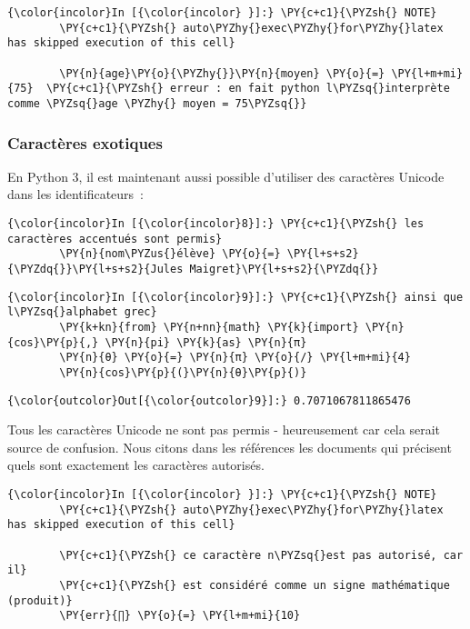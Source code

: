     \begin{Verbatim}[commandchars=\\\{\}]
{\color{incolor}In [{\color{incolor} }]:} \PY{c+c1}{\PYZsh{} NOTE}
        \PY{c+c1}{\PYZsh{} auto\PYZhy{}exec\PYZhy{}for\PYZhy{}latex has skipped execution of this cell}
        
        \PY{n}{age}\PY{o}{\PYZhy{}}\PY{n}{moyen} \PY{o}{=} \PY{l+m+mi}{75}  \PY{c+c1}{\PYZsh{} erreur : en fait python l\PYZsq{}interprète comme \PYZsq{}age \PYZhy{} moyen = 75\PYZsq{}}
\end{Verbatim}


    \hypertarget{caractuxe8res-exotiques}{%
\subsubsection{Caractères exotiques}\label{caractuxe8res-exotiques}}

    En Python 3, il est maintenant aussi possible d'utiliser des caractères
Unicode dans les identificateurs~:

    \begin{Verbatim}[commandchars=\\\{\}]
{\color{incolor}In [{\color{incolor}8}]:} \PY{c+c1}{\PYZsh{} les caractères accentués sont permis}
        \PY{n}{nom\PYZus{}élève} \PY{o}{=} \PY{l+s+s2}{\PYZdq{}}\PY{l+s+s2}{Jules Maigret}\PY{l+s+s2}{\PYZdq{}}
\end{Verbatim}


    \begin{Verbatim}[commandchars=\\\{\}]
{\color{incolor}In [{\color{incolor}9}]:} \PY{c+c1}{\PYZsh{} ainsi que l\PYZsq{}alphabet grec}
        \PY{k+kn}{from} \PY{n+nn}{math} \PY{k}{import} \PY{n}{cos}\PY{p}{,} \PY{n}{pi} \PY{k}{as} \PY{n}{π}
        \PY{n}{θ} \PY{o}{=} \PY{n}{π} \PY{o}{/} \PY{l+m+mi}{4}
        \PY{n}{cos}\PY{p}{(}\PY{n}{θ}\PY{p}{)}
\end{Verbatim}


\begin{Verbatim}[commandchars=\\\{\}]
{\color{outcolor}Out[{\color{outcolor}9}]:} 0.7071067811865476
\end{Verbatim}
            
    Tous les caractères Unicode ne sont pas permis - heureusement car cela
serait source de confusion. Nous citons dans les références les
documents qui précisent quels sont exactement les caractères autorisés.

    \begin{Verbatim}[commandchars=\\\{\}]
{\color{incolor}In [{\color{incolor} }]:} \PY{c+c1}{\PYZsh{} NOTE}
        \PY{c+c1}{\PYZsh{} auto\PYZhy{}exec\PYZhy{}for\PYZhy{}latex has skipped execution of this cell}
        
        \PY{c+c1}{\PYZsh{} ce caractère n\PYZsq{}est pas autorisé, car il}
        \PY{c+c1}{\PYZsh{} est considéré comme un signe mathématique (produit)}
        \PY{err}{∏} \PY{o}{=} \PY{l+m+mi}{10}
\end{Verbatim}


